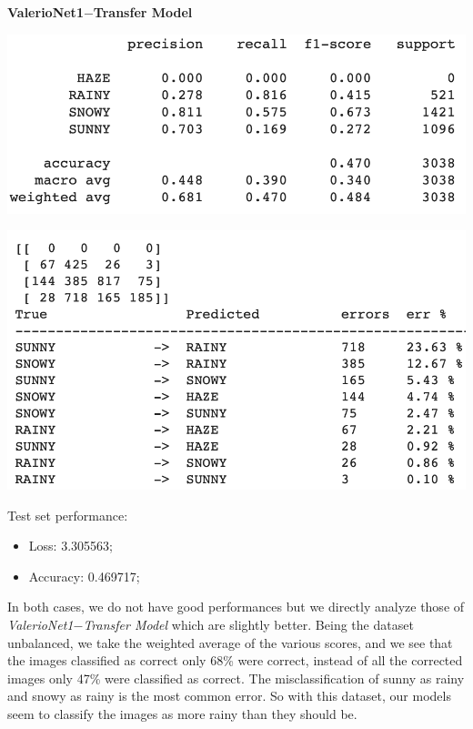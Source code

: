 \documentclass[12pt]{article}
\begin{document}
\bigskip
{\bf ValerioNet1$-$Transfer Model} \newline
\begin{minipage}[c]{.5\textwidth}
 \centering
 \includegraphics[width=\textwidth]{pic10}
\end{minipage}
\hspace{1em}
\begin{minipage}[c]{.5\textwidth}
 \centering
 \includegraphics[width=\textwidth]{pic11}
\end{minipage}

Test set performance:
\begin{itemize}
 \item Loss: 3.305563;
 \item Accuracy: 0.469717;
\end{itemize}

In both cases, we do not have good performances but we directly analyze those of {\em ValerioNet1$-$Transfer Model} which are slightly better.
Being the dataset unbalanced, we take the weighted average of the various scores, and we see that the images classified as correct only 68\% were correct, instead of all the corrected images only 47\% were classified as correct. The misclassification of sunny as rainy and snowy as rainy is the most common error. So with this dataset, our models seem to classify the images as more rainy than they should be.
\end{document}
